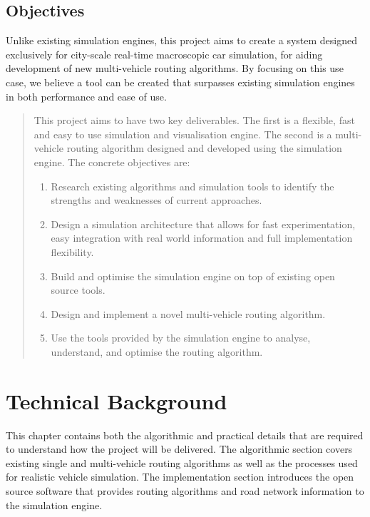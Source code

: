 \documentclass[ %
                    author={Alexander Hill},
                supervisor={Dr. Benjamin Sach},
                    degree={MEng},
                     title={MARMOSET},
                  subtitle={Multi-Agent Route Management using Online Simulation for Efficient Transportation},
                      type={research},
                      year={2016} ]{dissertation}
\begin{document}
\section{Objectives}

Unlike existing simulation engines, this project aims to create a system
designed exclusively for city-scale real-time macroscopic car simulation, for
aiding development of new multi-vehicle routing algorithms. By focusing on this
use case, we believe a tool can be created that surpasses existing simulation
engines in both performance and ease of use.

\begin{quote}
\noindent
This project aims to have two key deliverables. The first is a flexible, fast
and easy to use simulation and visualisation engine. The second is a
multi-vehicle routing algorithm designed and developed using the simulation
engine. The concrete objectives are:

\begin{enumerate}
    \item Research existing algorithms and simulation tools to identify the
            strengths and weaknesses of current approaches.
    \item Design a simulation architecture that allows for fast experimentation,
        easy integration with real world information and full implementation
        flexibility.
    \item Build and optimise the simulation engine on top of existing open
        source tools.
    \item Design and implement a novel multi-vehicle routing algorithm.
    \item Use the tools provided by the simulation engine to analyse,
        understand, and optimise the routing algorithm.
\end{enumerate}

\end{quote}


\chapter{Technical Background}
\label{chap:technical}

This chapter contains both the algorithmic and practical details that are
required to understand how the project will be delivered. The algorithmic
section covers existing single and multi-vehicle routing algorithms as well as
the processes used for realistic vehicle simulation. The implementation section
introduces the open source software that provides routing algorithms and road
network information to the simulation engine.
\end{document}
